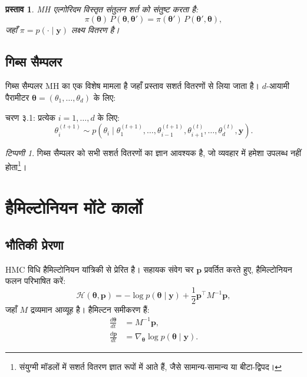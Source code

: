 \documentclass[12pt,a4paper]{article}
\theoremstyle{plain}
\newtheorem{proposition}[theorem]{प्रस्ताव}
\theoremstyle{definition}
\theoremstyle{remark}
\newtheorem{remark}[theorem]{टिप्पणी}
\begin{document}
\begin{proposition}
\label{prop:mh_balance}
MH एल्गोरिदम विस्तृत संतुलन शर्त को संतुष्ट करता है:
\[
\pi(\bm{\theta}) \, P(\bm{\theta}, \bm{\theta}') = \pi(\bm{\theta}') \, P(\bm{\theta}', \bm{\theta}),
\]
जहाँ $\pi = p(\cdot \mid \mathbf{y})$ लक्ष्य वितरण है।
\end{proposition}

\subsection{गिब्स सैम्पलर}

गिब्स सैम्पलर MH का एक विशेष मामला है जहाँ प्रस्ताव
सशर्त वितरणों से लिया जाता है। $d$-आयामी पैरामीटर
$\bm{\theta} = (\theta_1, \ldots, \theta_d)$ के लिए:

चरण ३.1: प्रत्येक $i = 1, \ldots, d$ के लिए:
\begin{equation}
\label{eq:gibbs}
\theta_i^{(t+1)} \sim p(\theta_i \mid \theta_1^{(t+1)}, \ldots, \theta_{i-1}^{(t+1)}, \theta_{i+1}^{(t)}, \ldots, \theta_d^{(t)}, \mathbf{y}).
\end{equation}

\begin{remark}
गिब्स सैम्पलर को सभी सशर्त वितरणों का ज्ञान आवश्यक है,
जो व्यवहार में हमेशा उपलब्ध नहीं होता\footnote{%
संयुग्मी मॉडलों में सशर्त वितरण ज्ञात रूपों में आते हैं,
जैसे सामान्य-सामान्य या बीटा-द्विपद।}।
\end{remark}

\section{हैमिल्टोनियन मोंटे कार्लो}
\label{sec:hmc}

\subsection{भौतिकी प्रेरणा}

HMC विधि हैमिल्टोनियन यांत्रिकी से प्रेरित है। सहायक
संवेग चर $\mathbf{p}$ प्रवर्तित करते हुए, हैमिल्टोनियन
फलन परिभाषित करें:
\begin{equation}
\label{eq:hamiltonian}
\mathcal{H}(\bm{\theta}, \mathbf{p}) = -\log p(\bm{\theta} \mid \mathbf{y}) + \frac{1}{2} \mathbf{p}^\top M^{-1} \mathbf{p},
\end{equation}
जहाँ $M$ द्रव्यमान आव्यूह है। हैमिल्टन समीकरण हैं:
\begin{align}
\label{eq:hamilton_eqs}
\frac{d\bm{\theta}}{dt} &= M^{-1} \mathbf{p}, \\
\frac{d\mathbf{p}}{dt} &= \nabla_{\bm{\theta}} \log p(\bm{\theta} \mid \mathbf{y}).
\end{align}
\end{document}
